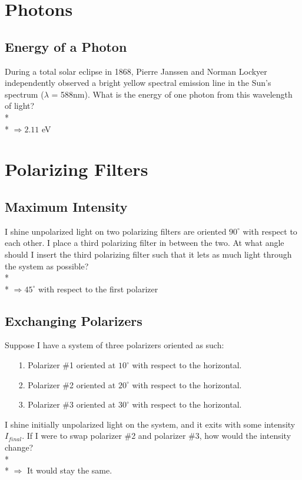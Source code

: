 \documentclass[11pt]{article}
\begin{document}

\pagebreak
\section{Photons}
\vspace{10pt}

\subsection{Energy of a Photon}
During a total solar eclipse in 1868, Pierre Janssen and Norman Lockyer independently observed a bright yellow spectral emission line in the Sun's spectrum ($\lambda$ = 588nm).  What is the energy of one photon from this wavelength of light? \\* \\*
$\Rightarrow 2.11$ eV


\pagebreak
\section{Polarizing Filters}
\vspace{10pt}

\subsection{Maximum Intensity}
I shine unpolarized light on two polarizing filters are oriented $90^\circ$ with respect to each other.  I place a third polarizing filter in between the two.  At what angle should I insert the third polarizing filter such that it lets as much light through the system as possible? \\* \\*
$\Rightarrow 45^\circ$ with respect to the first polarizer

\subsection{Exchanging Polarizers}
Suppose I have a system of three polarizers oriented as such:
\begin{itemize}
\item[1.] Polarizer \#1 oriented at $10^\circ$ with respect to the horizontal.
\item[2.] Polarizer \#2 oriented at $20^\circ$ with respect to the horizontal.
\item[3.] Polarizer \#3 oriented at $30^\circ$ with respect to the horizontal.
\end{itemize}
I shine initially unpolarized light on the system, and it exits with some intensity $I_{final}$.  If I were to swap polarizer \#2 and polarizer \#3, how would the intensity change? \\* \\*
$\Rightarrow$ It would stay the same.
\end{document}
